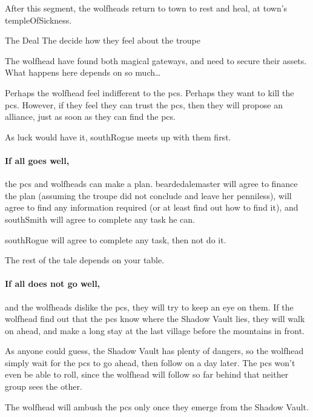 
After this \gls{segment}, the \glspl{wolfhead} return to \gls{town} to rest and heal, at \gls{town}'s \gls{templeOfSickness}.


{The Deal}%
{The  decide how they feel about the troupe}%

The \gls{wolfhead} have found both magical gateways, and need to secure their assets.
What happens here depends on so much\ldots

Perhaps the \gls{wolfhead} feel indifferent to the \glspl{pc}.
Perhaps they want to kill the \glspl{pc}.
However, if they feel they can trust the \glspl{pc}, then they will propose an alliance, just as soon as they can find the \glspl{pc}.

As luck would have it, \gls{southRogue} meets up with them first.

\paragraph{If all goes well,}
the \glspl{pc} and \glspl{wolfhead} can make a plan.
\Gls{beardedalemaster} will agree to finance the plan (assuming the troupe did not conclude  and leave her penniless),  will agree to find any information required (or at least find out how to find it), and \gls{southSmith} will agree to complete any task he can.

\Gls{southRogue} will agree to complete any task, then not do it.

The rest of the tale depends on your table.

\paragraph{If all does not go well,}
and the \glspl{wolfhead} dislike the \glspl{pc}, they will try to keep an eye on them.
If the \gls{wolfhead} find out that the \glspl{pc} know where the Shadow Vault lies, they will walk on ahead, and make a long stay at the last \gls{village} before the mountains in front.

As anyone could guess, the Shadow Vault has plenty of dangers, so the \gls{wolfhead} simply wait for the \glspl{pc} to go ahead, then follow on a day later.
The \glspl{pc} won't even be able to roll, since the \gls{wolfhead} will follow so far behind that neither group sees the other.

The \gls{wolfhead} will ambush the \glspl{pc} only once they emerge from the Shadow Vault.


